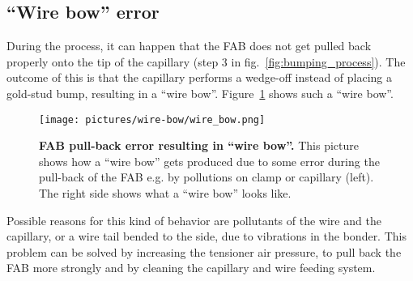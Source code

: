 \begin{appendices}
\section{``Wire bow'' error}\label{wire-bow_error}
During the process, it can happen that the \ac{FAB} does not get pulled back properly onto the tip of the capillary (step 3 in fig.~\ref{fig:bumping_process}). The outcome of this is that the capillary performs a wedge-off instead of placing a gold-stud bump, resulting in a ``wire bow''. Figure~\ref{pic:wire_bow} shows such a ``wire bow''.
\begin{figure}
\begin{center}
\texttt{[image: pictures/wire-bow/wire\_bow.png]}
\end{center}
\caption[FAB pull-back error resulting in ``wire bow'']{\textbf{FAB pull-back error resulting in ``wire bow''.} This picture shows how a ``wire bow'' gets produced due to some error during the pull-back of the FAB e.g. by pollutions on clamp or capillary (left). The right side shows what a ``wire bow'' looks like.}\label{pic:wire_bow}
\end{figure}
Possible reasons for this kind of behavior are pollutants of the wire and the capillary, or a wire tail bended to the side, due to vibrations in the bonder. This problem can be solved by increasing the tensioner air pressure, to pull back the \ac{FAB} more strongly and by cleaning the capillary and wire feeding system.





\end{appendices}
